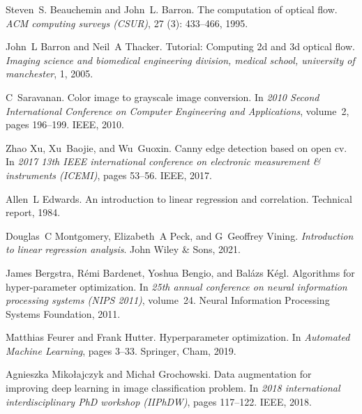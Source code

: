 \documentclass[twocolumn, switch]{article} %
\begin{document}
\begin{thebibliography}{27}
Steven~S. Beauchemin and John~L. Barron.
\newblock The computation of optical flow.
\newblock \emph{ACM computing surveys (CSUR)}, 27 (3):
  433--466, 1995.

John~L Barron and Neil~A Thacker.
\newblock Tutorial: Computing 2d and 3d optical flow.
\newblock \emph{Imaging science and biomedical engineering division, medical
  school, university of manchester}, 1, 2005.

C~Saravanan.
\newblock Color image to grayscale image conversion.
\newblock In \emph{2010 Second International Conference on Computer Engineering
  and Applications}, volume~2, pages 196--199. IEEE, 2010.

Zhao Xu, Xu~Baojie, and Wu~Guoxin.
\newblock Canny edge detection based on open cv.
\newblock In \emph{2017 13th IEEE international conference on electronic
  measurement \& instruments (ICEMI)}, pages 53--56. IEEE, 2017.

Allen~L Edwards.
\newblock An introduction to linear regression and correlation.
\newblock Technical report, 1984.

Douglas~C Montgomery, Elizabeth~A Peck, and G~Geoffrey Vining.
\newblock \emph{Introduction to linear regression analysis}.
\newblock John Wiley \& Sons, 2021.

James Bergstra, R{\'e}mi Bardenet, Yoshua Bengio, and Bal{\'a}zs K{\'e}gl.
\newblock Algorithms for hyper-parameter optimization.
\newblock In \emph{25th annual conference on neural information processing
  systems (NIPS 2011)}, volume~24. Neural Information Processing Systems
  Foundation, 2011.

Matthias Feurer and Frank Hutter.
\newblock Hyperparameter optimization.
\newblock In \emph{Automated Machine Learning}, pages 3--33. Springer, Cham,
  2019.

Agnieszka Miko{\l}ajczyk and Micha{\l} Grochowski.
\newblock Data augmentation for improving deep learning in image classification
  problem.
\newblock In \emph{2018 international interdisciplinary PhD workshop (IIPhDW)},
  pages 117--122. IEEE, 2018.


\end{thebibliography}
\end{document}
